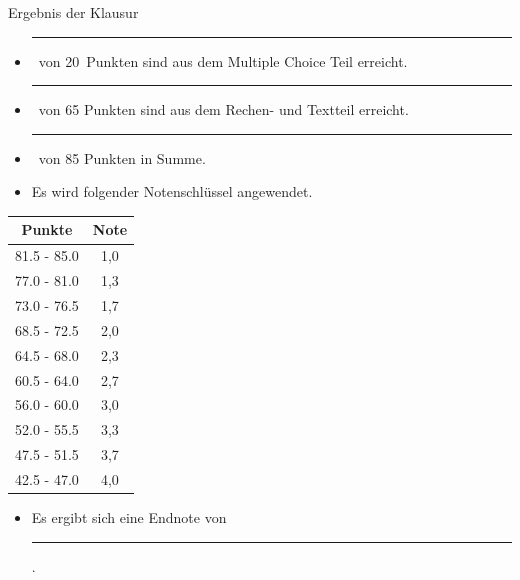 \documentclass[a4paper, 9pt]{scrartcl}\usepackage[]{graphicx}\usepackage[]{xcolor}
\begin{document}
\begin{graybox}{Ergebnis der Klausur}
  \vspace{1Ex}
  \begin{itemize}
  \item[] \rule[0ex]{3em}{.4pt}\, von 20\, Punkten sind aus dem Multiple
    Choice Teil erreicht.
  \item[] \rule[0ex]{3em}{.4pt}\, von 65 Punkten sind aus dem Rechen- und
    Textteil erreicht. 
  \item[] \rule[0ex]{3em}{.4pt}\, von 85 Punkten in Summe.
  \item[] Es wird folgender Notenschl{\"u}ssel angewendet.   
  \end{itemize}
  \vspace{1ex}
\begin{center}
  \begin{tabular}[c]{cc}
    \toprule
    \textbf{Punkte}	&	\textbf{Note}	\\
    \midrule
    81.5 - 85.0	&	1,0	\\
    77.0 - 81.0	&	1,3	\\
    73.0 - 76.5	&	1,7	\\
    68.5 - 72.5	&	2,0	\\
    64.5 - 68.0	&	2,3	\\
    60.5 - 64.0	&	2,7	\\
    56.0 - 60.0	&	3,0	\\
    52.0 - 55.5	&	3,3	\\
    47.5 - 51.5	&	3,7	\\
    42.5 - 47.0	&	4,0	\\
    \bottomrule
  \end{tabular}
\end{center}
  \vspace{1ex}
\begin{itemize}
\item[] Es ergibt sich eine Endnote von \rule[0ex]{4em}{.4pt}.
\end{itemize}
  \vspace{1Ex}
\end{graybox}

\newpage
\end{document}
